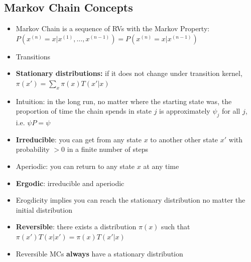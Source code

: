 \documentclass[../main.tex]{subfiles}
\begin{document}
\subsection{Markov Chain Concepts}
  \begin{itemize}
    \item Markov Chain is a sequence of RVs with the Markov Property: $P(x^{(n)} = x | x^{(1)}, \dotsc, x^{(n-1)}) = P(x^{(n)} = x | x^{(n-1)})$
    \item Transitions
    \item \textbf{Stationary distributions:} if it does not change under transition kernel, $\pi(x') = \sum_{x} \pi(x)T(x'|x)$
    \item Intuition: in the long run, no matter where the starting state was, the proportion of time the chain spends in state $j$ is approximately $\psi_{j}$ for all $j$, i.e. $\psi P = \psi$
    \item \textbf{Irreducible}: you can get from any state $x$ to another other state $x'$ with probability $> 0$ in a finite number of steps
    \item Aperiodic: you can return to any state $x$ at any time
    \item \textbf{Ergodic}: irreducible and aperiodic
    \item Erogdicity implies you can reach the stationary distribution no matter the initial distribution
    \item \textbf{Reversible}: there exists a distribution $\pi(x)$ such that $\pi(x')T(x|x') = \pi(x)T(x'|x)$
    \item Reversible MCs \textbf{always} have a stationary distribution
  \end{itemize}
\end{document}
